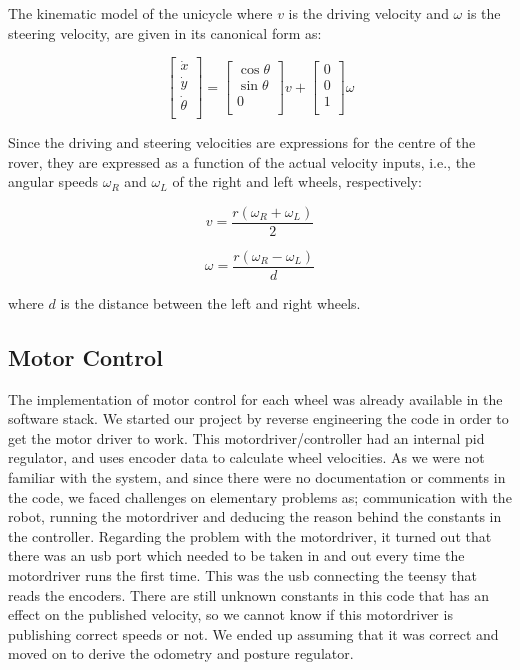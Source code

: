 \documentclass[a4paper,10pt]{article}
\begin{document}
The kinematic model of the unicycle where $v$ is the driving velocity and $\omega$ is the steering velocity,
are given in its canonical form as:

\begin{equation}
	\begin{bmatrix}
	\dot{x}\\ 
	\dot{y}\\
	\dot{\theta}\\  
	\end{bmatrix}
	=
	\begin{bmatrix}
	\cos{\theta}\\ 
	\sin{\theta}\\
	0\\  
	\end{bmatrix}v
	+
	\begin{bmatrix}
	0\\ 
	0\\
	1\\  
	\end{bmatrix}\omega
\end{equation}


Since the driving and steering velocities are expressions for the centre of the rover, they are expressed as a function of the actual velocity inputs, i.e., 
the angular speeds $\omega_{R}$ and $\omega_{L}$ of the right and left wheels, respectively:

		\begin{equation} \label{eq:v1}
			v=\frac{r(\omega_R +\omega_L)}{2}
		\end{equation}

		\begin{equation} \label{eq:omega1}
			\omega=\frac{r(\omega_R -\omega_L)}{d}
		\end{equation}

where $d$ is the distance between the left and right wheels.

\subsection{Motor Control}
	The implementation of motor control for each wheel was already available in the software stack. 
	We started our project by reverse engineering the code in order to get the motor driver to work.
	This motordriver/controller had an internal pid regulator, and uses encoder data to calculate wheel velocities.
	As we were not familiar with the system, and since there were no documentation or comments in the code, we faced challenges on elementary problems as; 
	communication with the robot, running the motordriver and deducing the reason behind the constants in the controller.
	Regarding the problem with the motordriver, it turned out that there was an usb port which needed to be taken in and out every time the motordriver runs the first time. 
	This was the usb connecting the teensy that reads the encoders. 
	There are still unknown constants in this code that has an effect on the published velocity, 
	so we cannot know if this motordriver is publishing correct speeds or not. 
	We ended up assuming that it was correct and moved on to derive the odometry and posture regulator.
	
\end{document}
